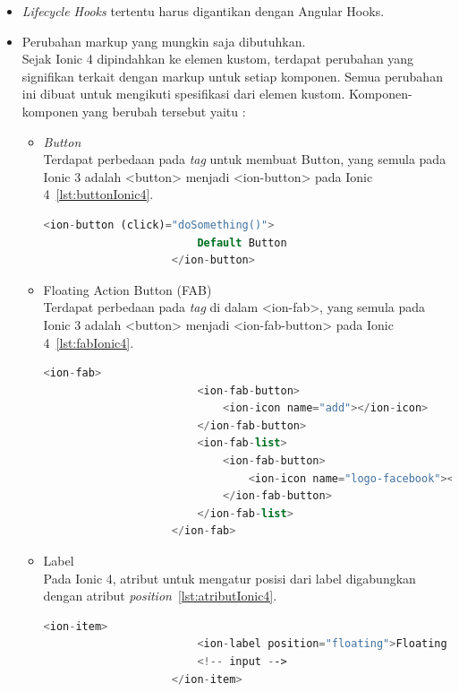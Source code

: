 \begin{enumerate}
\begin{enumerate}
\begin{itemize}
			\item {\it Lifecycle Hooks} tertentu harus digantikan dengan Angular Hooks.
			\item Perubahan markup yang mungkin saja dibutuhkan. \\
			Sejak Ionic 4 dipindahkan ke elemen kustom, terdapat perubahan yang signifikan terkait dengan markup untuk setiap komponen. Semua perubahan ini dibuat untuk mengikuti spesifikasi dari elemen kustom. Komponen-komponen yang berubah tersebut yaitu :

\newpage

			\begin{itemize}
				\item {\it Button} \\
				Terdapat perbedaan pada {\it tag} untuk membuat Button, yang semula pada Ionic 3 adalah <button> menjadi <ion-button> pada Ionic 4~\ref{lst:buttonIonic4}.
				\begin{lstlisting}[language=php, label={lst:buttonIonic4}, caption=Penggunaan Button pada Ionic 4]
					<ion-button (click)="doSomething()">
						Default Button
					</ion-button>
				\end{lstlisting}

				\item Floating Action Button (FAB) \\
				Terdapat perbedaan pada {\it tag} di dalam <ion-fab>, yang semula pada Ionic 3 adalah <button> menjadi <ion-fab-button> pada Ionic 4~\ref{lst:fabIonic4}.
				\begin{lstlisting}[language=php, label={lst:fabIonic4}, caption=Penggunaan Floating Action Button pada Ionic 4]
					<ion-fab>
						<ion-fab-button>
							<ion-icon name="add"></ion-icon>
						</ion-fab-button>
						<ion-fab-list>
							<ion-fab-button>
								<ion-icon name="logo-facebook"></ion-icon>
							</ion-fab-button>
  						</ion-fab-list>
					</ion-fab>
				\end{lstlisting}

				\item Label \\
				Pada Ionic 4, atribut untuk mengatur posisi dari label digabungkan dengan atribut {\it position}~\ref{lst:atributIonic4}.
				\begin{lstlisting}[language=php, label={lst:atributIonic4}, caption=Penggunaan Atribut {\it Position} pada Ionic 4]
					<ion-item>
						<ion-label position="floating">Floating Label</ion-label>
						<!-- input -->
					</ion-item>
				\end{lstlisting}


\end{itemize}
\end{itemize}
\end{enumerate}
\end{enumerate}
